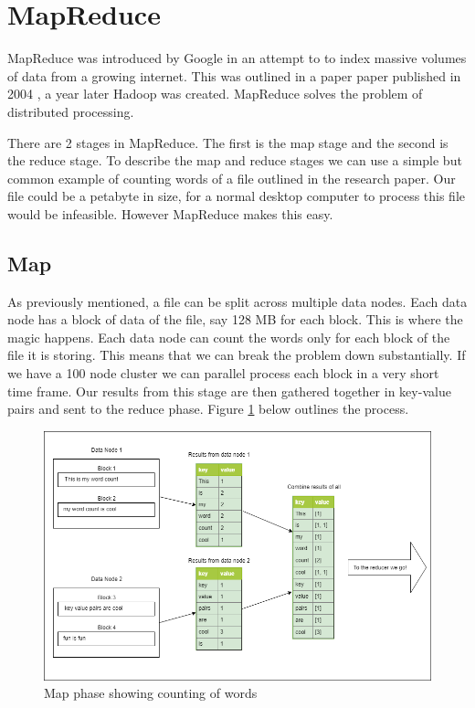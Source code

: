 \section{MapReduce}

MapReduce was introduced by Google in an attempt to to index massive volumes of data from a growing internet. This was outlined in a paper paper published in 2004 \cite{mapreduce}, a year later Hadoop was created. MapReduce solves the problem of distributed processing.

There are 2 stages in MapReduce. The first is the map stage and the second is the reduce stage. To describe the map and reduce stages we can use a simple but common example of counting words of a file outlined in the research paper\cite{mapreduce}. Our file could be a petabyte in size, for a normal desktop computer to process this file would be infeasible. However MapReduce makes this easy.

\subsection{Map}

As previously mentioned, a file can be split across multiple data nodes. Each data node has a block of data of the file, say 128 MB for each block. This is where the magic happens. Each data node can count the words only for each block of the file it is storing. This means that we can break the problem down substantially. If we have a 100 node cluster we can parallel process each block in a very short time frame. Our results from this stage are then gathered together in key-value pairs and sent to the reduce phase. Figure \ref{fig:map-phase} below outlines the process.

\begin{figure}[H]
  \includegraphics[width=\linewidth]{./images/map-phase.png}
  \caption{Map phase showing counting of words}
  \label{fig:map-phase}
\end{figure}

